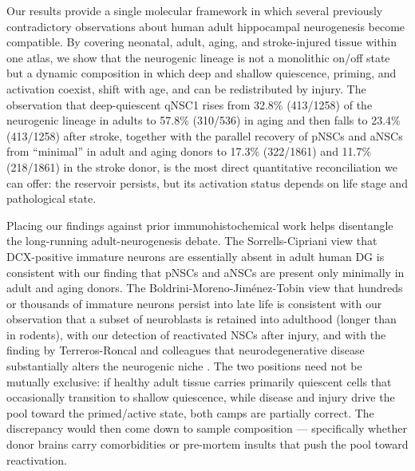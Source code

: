 \documentclass[11pt]{article}
\begin{document}
Our results provide a single molecular framework in which several
previously contradictory observations about human adult hippocampal
neurogenesis become compatible. By covering neonatal, adult, aging, and
stroke-injured tissue within one atlas, we show that the neurogenic
lineage is not a monolithic on/off state but a dynamic composition in
which deep and shallow quiescence, priming, and activation coexist,
shift with age, and can be redistributed by injury. The observation
that deep-quiescent qNSC1 rises from 32.8\% (413/1258) of the neurogenic
lineage in adults to 57.8\% (310/536) in aging and then falls to 23.4\%
(413/1258) after stroke, together with the parallel recovery of pNSCs and
aNSCs from ``minimal'' in adult and aging donors to 17.3\% (322/1861)
and 11.7\% (218/1861) in the stroke donor, is the most direct quantitative
reconciliation we can offer: the reservoir persists, but its activation
status depends on life stage and pathological state.

Placing our findings against prior immunohistochemical work helps
disentangle the long-running adult-neurogenesis debate. The
Sorrells-Cipriani view that DCX-positive immature neurons are essentially
absent in adult human DG \cite{sorrells2018human,cipriani2018hippocampal}
is consistent with our finding that pNSCs and aNSCs are present only
minimally in adult and aging donors. The Boldrini-Moreno-Jim\'{e}nez-Tobin
view that hundreds or thousands of immature neurons persist into late
life \cite{boldrini2018human,morenojimenez2019adult,tobin2019human} is
consistent with our observation that a subset of neuroblasts is retained
into adulthood (longer than in rodents), with our detection of reactivated
NSCs after injury, and with the finding by Terreros-Roncal and colleagues
that neurodegenerative disease substantially alters the neurogenic niche
\cite{terrerosroncal2021impact}. The two positions need not be mutually
exclusive: if healthy adult tissue carries primarily quiescent cells that
occasionally transition to shallow quiescence, while disease and injury
drive the pool toward the primed/active state, both camps are partially
correct. The discrepancy would then come down to sample composition ---
specifically whether donor brains carry comorbidities or pre-mortem
insults that push the pool toward reactivation.
\end{document}
